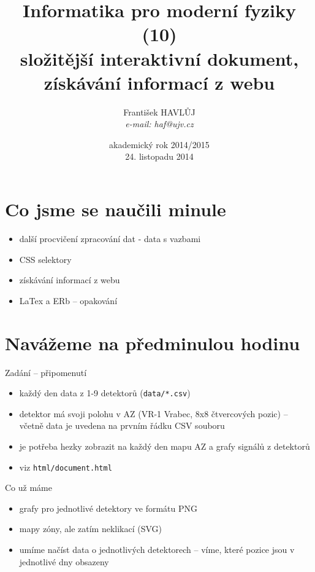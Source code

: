 \documentclass{beamer}
\title[IMF (10)]{Informatika pro moderní fyziky (10)\\ složitější interaktivní dokument, získávání informací z webu}
\author[Franti\v{s}ek HAVL\r{U}J, ORF ÚJV Řež]{Franti\v{s}ek HAVL\r{U}J\\{\scriptsize \emph{e-mail: haf@ujv.cz}}}
\date{akademický rok 2014/2015\\24. listopadu 2014}
\institute[ORF ÚJV Řež]
{ÚJV Řež\\oddělení Reaktorové fyziky a podpory palivového cyklu}
\begin{document}
\begin{frame}
  \titlepage
\end{frame}

\begin{frame}
  \tableofcontents
\end{frame}

\section{Co jsme se naučili minule}

\begin{frame}{}
  \begin{itemize}
    \item další procvičení zpracování dat - data s vazbami
    \item CSS selektory
    \item získávání informací z webu
    \item LaTex a ERb -- opakování
  \end{itemize}
\end{frame}

\section{Navážeme na předminulou hodinu}

\begin{frame}{Zadání -- připomenutí}
  \begin{itemize}
    \item každý den data z 1-9 detektorů (\texttt{data/*.csv})
    \item detektor má svoji polohu v AZ (VR-1 Vrabec, 8x8 čtvercových pozic) -- včetně data je uvedena na prvním řádku CSV souboru
    \item je potřeba hezky zobrazit na každý den mapu AZ a grafy signálů z detektorů
    \item viz \texttt{html/document.html}
  \end{itemize}
\end{frame}

\begin{frame}{Co už máme}
  \begin{itemize}
    \item grafy pro jednotlivé detektory ve formátu PNG
    \item mapy zóny, ale zatím neklikací (SVG)
    \item umíme načíst data o jednotlivých detektorech -- víme, které pozice jsou v jednotlivé dny obsazeny
  \end{itemize}
\end{frame}
\end{document}
